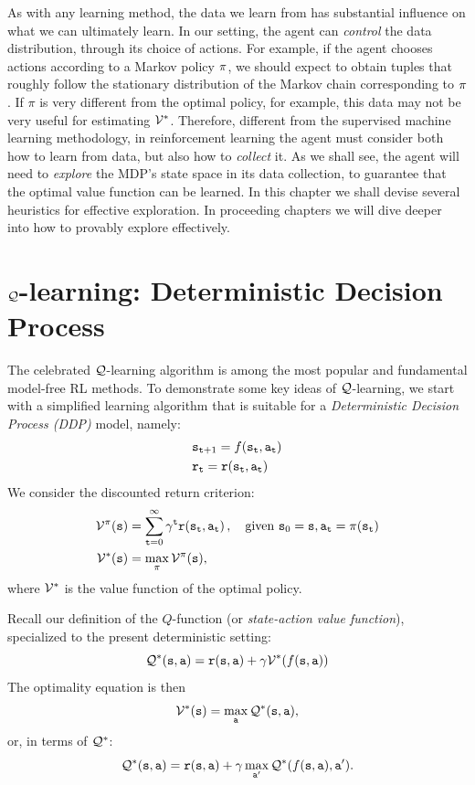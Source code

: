 As with any learning method, the data we learn from has substantial influence on what we can ultimately learn. In our setting, the agent can \textit{control} the data distribution, through its choice of actions. For example, if the agent chooses actions according to a Markov policy $\pi$, we should expect to obtain tuples that roughly follow the stationary distribution of the Markov chain corresponding to $\pi$. If $\pi$ is very different from the optimal policy, for example, this data may not be very useful for estimating $\mathcal{V}^*$. Therefore, different from the supervised machine learning methodology, in reinforcement learning the agent must consider both how to learn from data, but also how to \textit{collect} it. As we shall see, the agent will need to \textit{explore} the MDP's state space in its data collection, to guarantee that the optimal value function can be learned. In this chapter we shall devise several heuristics for effective exploration. In proceeding chapters we will dive deeper into how to provably explore effectively.


\section{ $\mathcal{Q}$-learning: Deterministic Decision Process}\label{sec:q_learning_DDP}

The celebrated $\mathcal{Q}$-learning algorithm is among the most popular and fundamental model-free RL methods.
To demonstrate some key ideas of $\mathcal{Q}$-learning, we start with a
simplified learning algorithm that is suitable for a {\em
Deterministic Decision Process (DDP)} model, namely:
\begin{align*}
& {\tt s}_{{\tt t}+1}=f({\tt s}_{\tt t},{\tt a}_{\tt t}) \\
& {\tt r}_{\tt t}={\tt r}({\tt s}_{\tt t},{\tt a}_{\tt t})
\end{align*}
We consider the discounted return criterion:
\begin{align*}
\mathcal{V}^{\pi}({\tt s}) &=\sum_{{\tt t}=0}^\infty \gamma^{\tt t}
{\tt r}({\tt s}_{\tt t},{\tt a}_{\tt t})\,,
\quad \text{given } {\tt s}_0={\tt s}, {\tt a}_{\tt t}=\pi({\tt s}_{\tt t})\\
\mathcal{V}^*({\tt s}) &= \max_\pi \mathcal{V}^\pi({\tt s}),
\end{align*}
where $\mathcal{V}^*$ is the value function of the optimal policy.

Recall our definition of the $Q$-function (or {\em state-action
value function}), specialized to the present deterministic setting:
$$
\mathcal{Q}^*({\tt s},{\tt a})={\tt r}({\tt s},{\tt a})+\gamma
\mathcal{V}^*(f({\tt s},{\tt a}))
$$
The optimality equation is then
$$
\mathcal{V}^*({\tt s}) = \max_{\tt a} \mathcal{Q}^*({\tt s},{\tt a}),
$$
or, in terms of $\mathcal{Q}^*$:
$$
\mathcal{Q}^*({\tt s},{\tt a})={\tt r}({\tt s},{\tt a})+\gamma
\max_{{\tt a}'}\mathcal{Q}^*(f({\tt s},{\tt a}),{\tt a}').
$$

